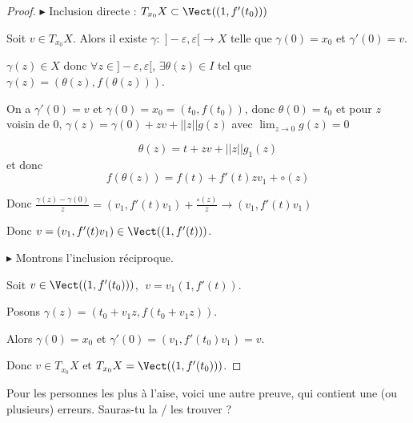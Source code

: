 \begin{proof}
    $\blacktriangleright$ Inclusion directe : $T_{x_0}X \subset \Vect((1, f'(t_0)))$

    Soit $v \in T_{x_0}X$. Alors il existe $\gamma : \; ]- \varepsilon, \varepsilon[ \to X$ telle que 
    $\gamma(0) = x_0$ et $\gamma'(0) = v$.

    $\gamma(z) \in X$ donc $\forall z \in ]- \varepsilon, \varepsilon[$, 
    $\exists \theta(z) \in I$ tel que $\gamma(z) = (\theta(z), f(\theta(z)))$.

    On a $\gamma'(0) = v$ et $\gamma(0) = x_0 = (t_0, f(t_0))$, donc $\theta(0) = t_0$ 
    et pour $z$ voisin de $0$, $\gamma(z) = \gamma(0) + zv + ||z|| g(z)$ avec
    $\displaystyle \lim_{z \to 0} g(z) = 0$

    $$\theta(z) = t + z v + ||z|| g_1(z)$$ et donc $$f(\theta(z)) = f(t) + f'(t)z v_1 + \circ (z)$$ 

    Donc $\displaystyle \frac{\gamma(z) - \gamma(0)} z = (v_1, f'(t) v_1) + \frac{\circ(z)} z \to (v_1, f'(t) v_1)$

    Donc $v = (v_1, f'(t) v_1) \in \Vect((1, f'(t)))$.

    \lvspace
    
    $\blacktriangleright$ Montrons l'inclusion réciproque. 
    
    Soit $v \in \Vect((1, f'(t_0)))$, $\; v = v_1 (1, f'(t))$.

    Posons $\gamma(z) = (t_0 + v_1 z, f(t_0 + v_1 z))$.

    Alors $\gamma(0) = x_0$ et $\gamma'(0) = (v_1, f'(t_0) v_1) = v$.

    Donc $v \in T_{x_0}X$ et $T_{x_0}X = \Vect((1, f'(t_0)))$.
\end{proof}

Pour les personnes les plus à l'aise, voici une autre preuve, qui contient une (ou plusieurs) erreurs. 
Sauras-tu la / les trouver ?

